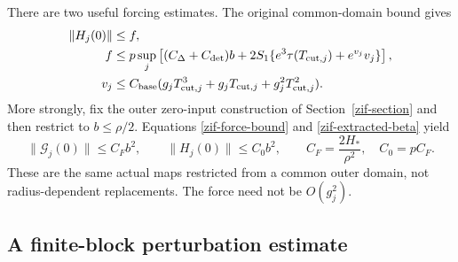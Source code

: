 There are two useful forcing estimates. The original common-domain
bound gives
\begin{align}
 \|H_j(0)\|&\le f, \notag\\
 f&\le p\sup_j\left[
 (C_\Delta+C_{\rm det})b+
 2S_1\{e^3\tau(T_{{\rm cut},j})+e^{v_j}v_j\}\right],
 \notag\\
 v_j&\le C_{\rm base}
       (g_jT_{{\rm cut},j}^3+g_jT_{{\rm cut},j}
                              +g_j^2T_{{\rm cut},j}^2).
 \label{eqr-crude-force}
\end{align}
More strongly, fix the outer zero-input construction of
Section~\ref{zif-section} and then restrict to $b\le\rho/2$.
Equations \eqref{zif-force-bound} and
\eqref{zif-extracted-beta} yield
\begin{equation}
 \|\mathcal G_j(0)\|\le C_Fb^2,\qquad
 \|H_j(0)\|\le C_0b^2,\qquad
 C_F=\frac{2H_*}{\rho^2},\quad C_0=pC_F.
 \label{eqr-quadratic-force}
\end{equation}
These are the same actual maps restricted from a common outer
domain, not radius-dependent replacements. The force need not be
$O(g_j^2)$.

\subsection{A finite-block perturbation estimate}
\label{eqr-block-section}

